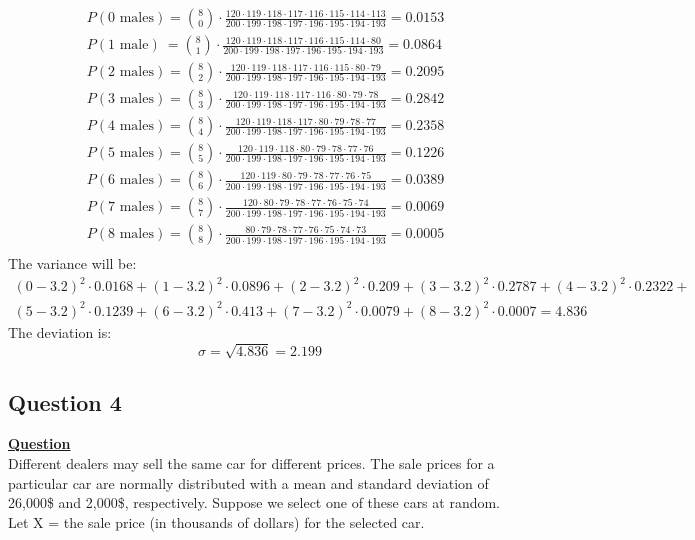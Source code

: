 \documentclass[a4, 12pt,titlepage]{scrartcl}
\begin{document}
\begin{align*}
&P(\textrm{0 males}) =\binom{8}{0}\cdot \frac{120\cdot119\cdot118\cdot117\cdot116\cdot115\cdot114\cdot113}{200\cdot199\cdot198\cdot197\cdot196\cdot195\cdot194\cdot193} =0.0153
\\
&P(\textrm{1 male})\ =\binom{8}{1}\cdot \frac{120\cdot119\cdot118\cdot117\cdot116\cdot115\cdot114\cdot80}{200\cdot199\cdot198\cdot197\cdot196\cdot195\cdot194\cdot193}=0.0864
\\
&P(\textrm{2 males})=\binom{8}{2}\cdot \frac{120\cdot119\cdot118\cdot117\cdot116\cdot115\cdot80\cdot79}{200\cdot199\cdot198\cdot197\cdot196\cdot195\cdot194\cdot193}=0.2095
\\
&P(\textrm{3 males})=\binom{8}{3}\cdot \frac{120\cdot119\cdot118\cdot117\cdot116\cdot80\cdot79\cdot78}{200\cdot199\cdot198\cdot197\cdot196\cdot195\cdot194\cdot193}=0.2842
\\
&P(\textrm{4 males})=\binom{8}{4}\cdot \frac{120\cdot119\cdot118\cdot117\cdot80\cdot79\cdot78\cdot77}{200\cdot199\cdot198\cdot197\cdot196\cdot195\cdot194\cdot193}=0.2358
\\
&P(\textrm{5 males})=\binom{8}{5}\cdot \frac{120\cdot119\cdot118\cdot80\cdot79\cdot78\cdot77\cdot76}{200\cdot199\cdot198\cdot197\cdot196\cdot195\cdot194\cdot193}=0.1226
\\
&P(\textrm{6 males})=\binom{8}{6}\cdot \frac{120\cdot119\cdot80\cdot79\cdot78\cdot77\cdot76\cdot75}{200\cdot199\cdot198\cdot197\cdot196\cdot195\cdot194\cdot193}=0.0389
\\
&P(\textrm{7 males})=\binom{8}{7}\cdot \frac{120\cdot80\cdot79\cdot78\cdot77\cdot76\cdot75\cdot74}{200\cdot199\cdot198\cdot197\cdot196\cdot195\cdot194\cdot193}=0.0069
\\
&P(\textrm{8 males})=\binom{8}{8}\cdot \frac{80\cdot79\cdot78\cdot77\cdot76\cdot75\cdot74\cdot73}{200\cdot199\cdot198\cdot197\cdot196\cdot195\cdot194\cdot193}=0.0005
\\
\end{align*}
The variance will be:
\begin{multline*}
(0-3.2)^2\cdot 0.0168+(1-3.2)^2\cdot 0.0896 + (2-3.2)^2\cdot 0.209 + (3-3.2)^2\cdot 0.2787 + (4-3.2)^2 \cdot 0.2322 +\\
 (5-3.2)^2 \cdot 0.1239 + (6-3.2)^2 \cdot 0.413 + (7-3.2)^2 \cdot 0.0079 + (8-3.2)^2 \cdot 0.0007=4.836
\end{multline*}
The deviation is:\[
\boxed{\sigma= \sqrt{4.836}=2.199}
\]
\newpage

\subsection{Question 4}
\textbf{\underline{Question}}\\
Different dealers may sell the same car for different prices.
The sale prices for a particular car are normally distributed with a mean and standard deviation of 26,000\$ and 2,000\$, respectively.
 Suppose we select one of these cars at random.
 Let X = the sale price (in thousands of dollars) for the selected car.\\
 
\end{document}
